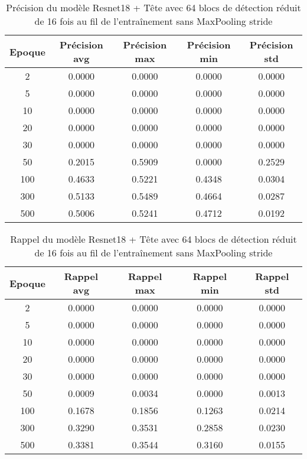 \begin{table}[!ht]
    \caption{Précision du modèle Resnet18 + Tête avec 64 blocs de détection réduit de 16 fois au fil de l'entraînement sans MaxPooling stride}
    \label{tab:resnet18+head_64n_reduced_16x_precision_wo_maxpool_stride}
    \centering
    \begin{tabular}{ |c||c|c|c|c|  }
        \hline
        \rowcolor{gray!50}
        Epoque & Précision avg & Précision max & Précision min & Précision std\\
        \hline
        2 & 0.0000 & 0.0000 & 0.0000 & 0.0000\\
        5 & 0.0000 & 0.0000 & 0.0000 & 0.0000\\
        10 & 0.0000 & 0.0000 & 0.0000 & 0.0000\\
        20 & 0.0000 & 0.0000 & 0.0000 & 0.0000\\
        30 & 0.0000 & 0.0000 & 0.0000 & 0.0000\\
        50 & 0.2015 & 0.5909 & 0.0000 & 0.2529\\
        100 & 0.4633 & 0.5221 & 0.4348 & 0.0304\\
        300 & 0.5133 & 0.5489 & 0.4664 & 0.0287\\
        500 & 0.5006 & 0.5241 & 0.4712 & 0.0192\\
        \hline
    \end{tabular}
\end{table}

\begin{table}[!ht]
    \caption{Rappel du modèle Resnet18 + Tête avec 64 blocs de détection réduit de 16 fois au fil de l'entraînement sans MaxPooling stride}
    \label{tab:resnet18+head_64n_reduced_16x_rappel_wo_maxpool_stride}
    \centering
    \begin{tabular}{ |c||c|c|c|c|  }
        \hline
        \rowcolor{gray!50}
        Epoque & Rappel avg & Rappel max & Rappel min & Rappel std\\
        \hline
        2 & 0.0000 & 0.0000 & 0.0000 & 0.0000\\
        5 & 0.0000 & 0.0000 & 0.0000 & 0.0000\\
        10 & 0.0000 & 0.0000 & 0.0000 & 0.0000\\
        20 & 0.0000 & 0.0000 & 0.0000 & 0.0000\\
        30 & 0.0000 & 0.0000 & 0.0000 & 0.0000\\
        50 & 0.0009 & 0.0034 & 0.0000 & 0.0013\\
        100 & 0.1678 & 0.1856 & 0.1263 & 0.0214\\
        300 & 0.3290 & 0.3531 & 0.2858 & 0.0230\\
        500 & 0.3381 & 0.3544 & 0.3160 & 0.0155\\
        \hline
    \end{tabular}
\end{table}

